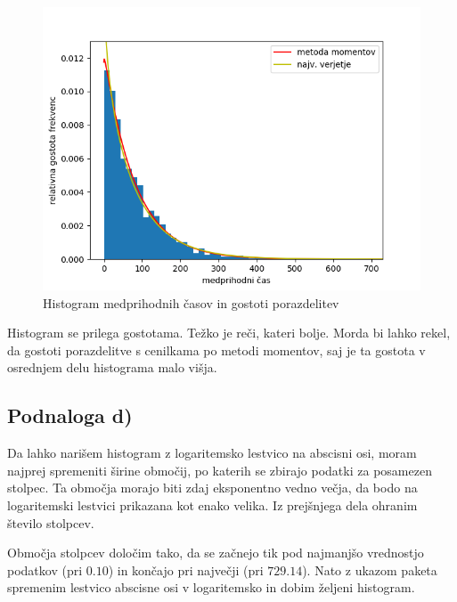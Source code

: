 \documentclass[12pt, a4paper]{article}
\begin{document}
\begin{figure}[h]
\includegraphics[width=\linewidth]{histogram_gostoti.png}
\centering
\caption{Histogram medprihodnih časov in gostoti porazdelitev}
\end{figure}

Histogram se prilega gostotama. Težko je reči, kateri bolje. Morda bi lahko rekel, da gostoti porazdelitve s cenilkama po metodi momentov, saj je ta gostota v osrednjem delu histograma malo višja.

\subsection*{Podnaloga d)}
Da lahko narišem histogram z logaritemsko lestvico na abscisni osi, moram najprej spremeniti širine območij, po katerih se zbirajo podatki za posamezen stolpec. Ta območja morajo biti zdaj eksponentno vedno večja, da bodo na logaritemski lestvici prikazana kot enako velika. Iz prejšnjega dela ohranim število stolpcev.

Območja stolpcev določim tako, da se začnejo tik pod najmanjšo vrednostjo podatkov (pri $0.10$) in končajo pri največji (pri $729.14$). Nato z ukazom paketa spremenim lestvico abscisne osi v logaritemsko in dobim željeni histogram.
\end{document}
